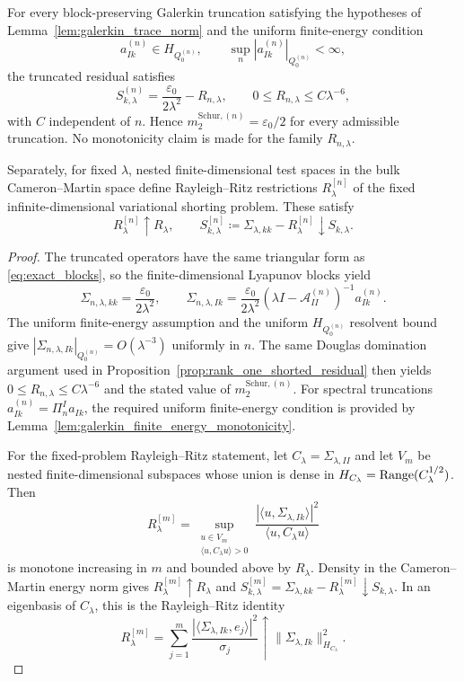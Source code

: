 \begin{lemma}
\label{lem:galerkin_variational_shorting}
For every block-preserving Galerkin truncation satisfying the hypotheses of
Lemma~\ref{lem:galerkin_trace_norm} and the uniform finite-energy condition
\[
  a_{Ik}^{(n)}\in H_{Q_0^{(n)}},
  \qquad
  \sup_n |a_{Ik}^{(n)}|_{Q_0^{(n)}}<\infty,
\]
the truncated residual satisfies
\[
  S_{k,\lambda}^{(n)}
  =
  \frac{\varepsilon_0}{2\lambda^2}-R_{n,\lambda},
  \qquad
  0\le R_{n,\lambda}\le C\lambda^{-6},
\]
with $C$ independent of $n$.  Hence
$m_2^{\mathrm{Schur},(n)}=\varepsilon_0/2$ for every admissible truncation.
No monotonicity claim is made for the family $R_{n,\lambda}$.

Separately, for fixed $\lambda$, nested finite-dimensional test spaces in the
bulk Cameron--Martin space define Rayleigh--Ritz restrictions
$R_\lambda^{[n]}$ of the fixed infinite-dimensional variational shorting
problem.  These satisfy
\[
  R_\lambda^{[n]}\uparrow R_\lambda,
  \qquad
  S_{k,\lambda}^{[n]}\coloneqq\Sigma_{\lambda,kk}-R_\lambda^{[n]}
  \downarrow S_{k,\lambda}.
\]
\end{lemma}

\begin{proof}
The truncated operators have the same triangular form as
\eqref{eq:exact_blocks}, so the finite-dimensional Lyapunov blocks yield
\[
  \Sigma_{n,\lambda,kk}=\frac{\varepsilon_0}{2\lambda^2},
  \qquad
  \Sigma_{n,\lambda,Ik}
  =
  \frac{\varepsilon_0}{2\lambda^2}
  (\lambda I-\mathcal{A}_{II}^{(n)})^{-1}a_{Ik}^{(n)}.
\]
The uniform finite-energy assumption and the uniform $H_{Q_0^{(n)}}$ resolvent
bound give
$|\Sigma_{n,\lambda,Ik}|_{Q_0^{(n)}}=O(\lambda^{-3})$ uniformly in $n$.
The same Douglas domination argument used in
Proposition~\ref{prop:rank_one_shorted_residual} then yields
$0\le R_{n,\lambda}\le C\lambda^{-6}$ and the stated value of
$m_2^{\mathrm{Schur},(n)}$.  For spectral truncations
$a_{Ik}^{(n)}=\Pi_n^I a_{Ik}$, the required uniform finite-energy condition is
provided by Lemma~\ref{lem:galerkin_finite_energy_monotonicity}.

For the fixed-problem Rayleigh--Ritz statement, let
$C_\lambda=\Sigma_{\lambda,II}$ and let $V_m$ be nested finite-dimensional
subspaces whose union is dense in $H_{C_\lambda}=\operatorname{Range}(C_\lambda^{1/2})$.
Then
\[
  R_\lambda^{[m]}
  =
  \sup_{\substack{u\in V_m\\ \langle u,C_\lambda u\rangle>0}}
  \frac{|\langle u,\Sigma_{\lambda,Ik}\rangle|^2}
       {\langle u,C_\lambda u\rangle}
\]
is monotone increasing in $m$ and bounded above by $R_\lambda$.  Density in the
Cameron--Martin energy norm gives $R_\lambda^{[m]}\uparrow R_\lambda$ and
$S_{k,\lambda}^{[m]}=\Sigma_{\lambda,kk}-R_\lambda^{[m]}\downarrow
S_{k,\lambda}$.  In an eigenbasis of $C_\lambda$, this is the Rayleigh--Ritz
identity
\[
  R_\lambda^{[m]}
  =
  \sum_{j=1}^m
  \frac{|\langle\Sigma_{\lambda,Ik},e_j\rangle|^2}{\sigma_j}
  \uparrow
  \|\Sigma_{\lambda,Ik}\|_{H_{C_\lambda}}^2.
\]
\end{proof}


